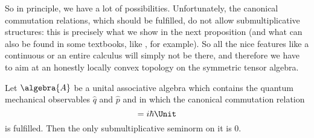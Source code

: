So in principle, we have a lot of possibilities. Unfortunately, the canonical 
commutation relations, which should be fulfilled, do not allow 
submultiplicative structures: this is precisely what we show in the next 
proposition (and what can also be found in some textbooks, like 
\cite{reed.simon:1980a}, for example). So all the nice features like a continuous 
or an entire calculus will simply not be there, and therefore we have to aim at an 
honestly locally convex topology on the symmetric tensor algebra.
\begin{proposition}
	\label{Prop:LCAna:QMnotLMC}
	Let $\algebra{A}$ be a unital associative algebra which contains the 
	quantum mechanical observables $\hat{q}$ and $\hat{p}$ and in which 
	the canonical commutation relation
	\begin{equation*}
		[\hat{q}, \hat{p}]
		=
		i \hbar \Unit
	\end{equation*}
	is fulfilled. Then the only submultiplicative seminorm on it is 0.
\end{proposition}
